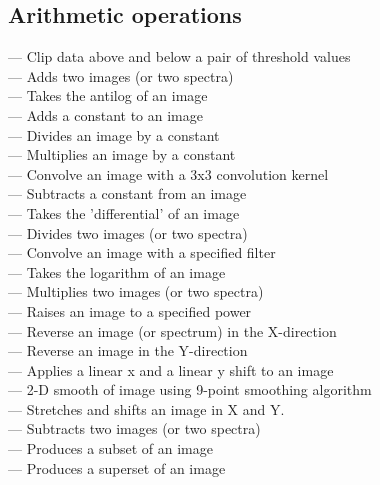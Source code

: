 \subsection{\label{classifarith}Arithmetic operations}

 --- Clip data above and below a pair of threshold values\\
 --- Adds two images (or two spectra)\\
 --- Takes the antilog of an image\\
 --- Adds a constant to an image\\
 --- Divides an image by a constant\\
 --- Multiplies an image by a constant\\
 --- Convolve an image with a 3x3 convolution kernel\\
 --- Subtracts a constant from an image\\
 --- Takes the 'differential' of an image\\
 --- Divides two images (or two spectra)\\
 --- Convolve an image with a specified filter\\
 --- Takes the logarithm of an image\\
 --- Multiplies two images (or two spectra)\\
 --- Raises an image to a specified power\\
 --- Reverse an image (or spectrum) in the X-direction\\
 --- Reverse an image in the Y-direction\\
 --- Applies a linear x and a linear y shift to an image\\
 --- 2-D smooth of image using 9-point smoothing algorithm\\
 --- Stretches and shifts an image in X and Y.\\
 --- Subtracts two images (or two spectra)\\
 --- Produces a subset of an image\\
 --- Produces a superset of an image\\
